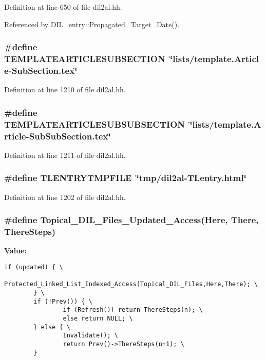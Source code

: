 Definition at line 650 of file dil2al.hh.

Referenced by DIL\_\-entry::Propagated\_\-Target\_\-Date().
\subsubsection{\setlength{\rightskip}{0pt plus 5cm}\#define TEMPLATEARTICLESUBSECTION\ \char`\"{}lists/template.Article-Sub\-Section.tex\char`\"{}}\label{dil2al_8hh_a63}




Definition at line 1210 of file dil2al.hh.
\subsubsection{\setlength{\rightskip}{0pt plus 5cm}\#define TEMPLATEARTICLESUBSUBSECTION\ \char`\"{}lists/template.Article-Sub\-Sub\-Section.tex\char`\"{}}\label{dil2al_8hh_a64}




Definition at line 1211 of file dil2al.hh.
\subsubsection{\setlength{\rightskip}{0pt plus 5cm}\#define TLENTRYTMPFILE\ \char`\"{}tmp/dil2al-TLentry.html\char`\"{}}\label{dil2al_8hh_a55}




Definition at line 1202 of file dil2al.hh.
\subsubsection{\setlength{\rightskip}{0pt plus 5cm}\#define Topical\_\-DIL\_\-Files\_\-Updated\_\-Access(Here, There, There\-Steps)}\label{dil2al_8hh_a8}


{\bf Value:}

\footnotesize\begin{verbatim}if (updated) { \
                Protected_Linked_List_Indexed_Access(Topical_DIL_Files,Here,There); \
        } \
        if (!Prev()) { \
                if (Refresh()) return ThereSteps(n); \
                else return NULL; \
        } else { \
                Invalidate(); \
                return Prev()->ThereSteps(n+1); \
        }\end{verbatim}\normalsize 


